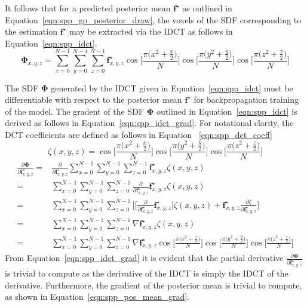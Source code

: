 It follows that for a predicted posterior mean \( \bm{f}^{\star} \) as outlined in 
Equation~\ref{eqn:spp_gp_posterior_draw}, the voxels of the SDF corresponding to the 
estimation \( \bm{f}^{\star} \) may be extracted via the IDCT as follows in 
Equation~\ref{eqn:spp_idct}.
\begin{equation}
  \label{eqn:spp_idct}
  \bm{\Phi}_{x, y, z} = \sum_{x=0}^{N-1} \sum_{y=0}^{N-1} \sum_{z=0}^{N-1} 
  \bm{f}^{\star}_{x, y, z}
  \cos \Big[ \frac{\pi \big( x^{2} + \frac{x}{2} \big)}{N} \Big]
  \cos \Big[ \frac{\pi \big( y^{2} + \frac{y}{2} \big)}{N} \Big]
  \cos \Big[ \frac{\pi \big( z^{2} + \frac{z}{2} \big)}{N} \Big]
\end{equation}

The SDF \( \bm{\Phi} \) generated by the IDCT given in Equation~\ref{eqn:spp_idct} must be 
differentiable with respect to the posterior mean \( \bm{f}^{\star} \) for backpropagation 
training of the model. The gradent of the SDF \( \bm{\Phi} \) outlined in 
Equation~\ref{eqn:spp_idct} is derived as follows in Equation~\ref{eqn:spp_idct_grad}. 
For notational clarity, the DCT coefficients are defined as follows in Equation
~\ref{eqn:spp_dct_coeff}
\begin{equation}
  \label{eqn:spp_dct_coeff}
  \zeta(x, y, z) = 
  \cos \Big[ \frac{\pi \big( x^{2} + \frac{x}{2} \big)}{N} \Big]
  \cos \Big[ \frac{\pi \big( y^{2} + \frac{y}{2} \big)}{N} \Big]
  \cos \Big[ \frac{\pi \big( z^{2} + \frac{z}{2} \big)}{N} \Big]
\end{equation}
\begin{align}
  \label{eqn:spp_idct_grad}
  \frac{\partial \bm{\Phi}}{\partial \bm{f}_{x, y, z}^{\star}} ={}&
  \frac{\partial}{\partial \bm{f}_{x, y, z}^{\star}}
  \sum_{x=0}^{N-1} \sum_{y=0}^{N-1} \sum_{z=0}^{N-1} 
  \bm{f}^{\star}_{x, y, z} \zeta(x, y, z)\\
  ={}& \sum_{x=0}^{N-1} \sum_{y=0}^{N-1} \sum_{z=0}^{N-1} 
  \frac{\partial}{\partial \bm{f}_{x, y, z}^{\star}} \bm{f}^{\star}_{x, y, z}
  \zeta(x, y, z)\\
  ={}& \sum_{x=0}^{N-1} \sum_{y=0}^{N-1} \sum_{z=0}^{N-1} \Bigg[
    \Bigg[ 
      \frac{\partial}{\partial \bm{f}_{x, y, z}^{\star}} \bm{f}^{\star}_{x, y, z} 
    \Bigg] \zeta(x, y, z)
    + \bm{f}_{x, y, z}^{\star} \frac{\partial \zeta}{\partial \bm{f}_{x, y, z}^{\star}}
  \Bigg]\\
  ={}& \sum_{x=0}^{N-1} \sum_{y=0}^{N-1} \sum_{z=0}^{N-1}
  \nabla \bm{f}_{x, y, z}^{\star} \zeta(x, y, z)\\
  ={}& \sum_{x=0}^{N-1} \sum_{y=0}^{N-1} \sum_{z=0}^{N-1} 
  \nabla \bm{f}^{\star}_{x, y, z}
  \cos \Big[ \frac{\pi \big( x^{2} + \frac{x}{2} \big)}{N} \Big]
  \cos \Big[ \frac{\pi \big( y^{2} + \frac{y}{2} \big)}{N} \Big]
  \cos \Big[ \frac{\pi \big( z^{2} + \frac{z}{2} \big)}{N} \Big]
\end{align}
From Equation~\ref{eqn:spp_idct_grad} it is evident that the partial derivative 
\( \frac{\partial \bm{\Phi}}{\partial \bm{f}_{x, y, z}^{\star}} \) is trivial 
to compute as the derivative of the IDCT is simply the IDCT of the derivative. 
Furthermore, the gradient of the posterior mean is trivial to compute, as shown 
in Equation~\ref{eqn:spp_pos_mean_grad}.

